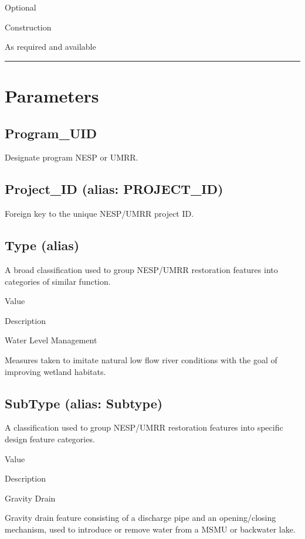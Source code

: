 \documentclass[
  letterpaper,
  DIV=11,
  numbers=noendperiod]{scrreprt}
\begin{document}
Optional

Construction

As required and available

\begin{center}\rule{0.5\linewidth}{0.5pt}\end{center}

\section{Parameters}\label{parameters-14}

\subsection{Program\_UID}\label{program_uid-14}

Designate program NESP or UMRR.

\subsection{Project\_ID (alias:
PROJECT\_ID)}\label{project_id-alias-project_id-14}

Foreign key to the unique NESP/UMRR project ID.

\subsection{Type (alias)}\label{type-alias-13}

A broad classification used to group NESP/UMRR restoration features into
categories of similar function.

Value

Description

Water Level Management

Measures taken to imitate natural low flow river conditions with the
goal of improving wetland habitats.

\subsection{SubType (alias: Subtype)}\label{subtype-alias-subtype-14}

A classification used to group NESP/UMRR restoration features into
specific design feature categories.

Value

Description

Gravity Drain

Gravity drain feature consisting of a discharge pipe and an
opening/closing mechanism, used to introduce or remove water from a MSMU
or backwater lake.
\end{document}
